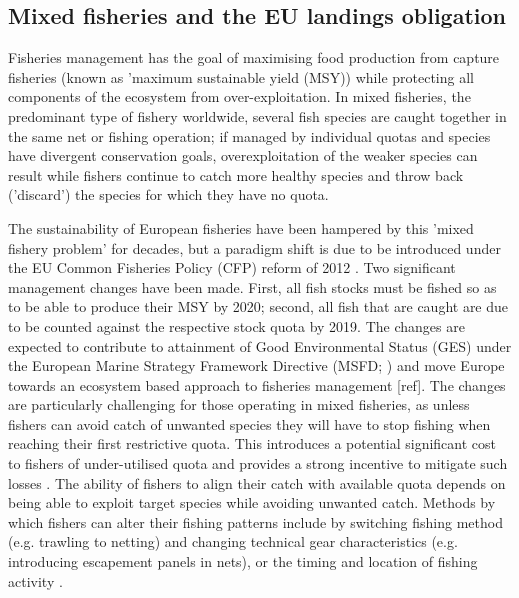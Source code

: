 \documentclass{nature}
\begin{document}
\begin{linenumbers}
\begin{abstract}
[263 words]

\end{abstract}

\section*{}

\subsection{Mixed fisheries and the EU landings obligation} 

Fisheries management has the goal of maximising food production from capture
fisheries (known as 'maximum sustainable yield (MSY)) while protecting all
components of the ecosystem from over-exploitation. In mixed fisheries, the
predominant type of fishery worldwide, several fish species are caught together
in the same net or fishing operation; if managed by individual quotas and
species have divergent conservation goals, overexploitation of the
weaker species can result while fishers continue to catch more healthy species
and throw back ('discard') the species for which they have no quota.

The sustainability of European fisheries have been hampered by this 'mixed
fishery problem' for decades, but a paradigm shift is due to be introduced
under the EU Common Fisheries Policy (CFP) reform of 2012
\cite{EuropeanParliamentandCounciloftheEuropeanUnion2013}. Two significant
management changes have been made. First, all fish stocks must be fished so as
to be able to produce their MSY by 2020; second, all fish that are caught are
due to be counted against the respective stock quota by 2019. The changes are
expected to contribute to attainment of Good Environmental Status (GES) under
the European Marine Strategy Framework Directive (MSFD;
\cite{EuropeanParliament2008}) and move Europe towards an ecosystem based
approach to fisheries management [ref]. The changes are particularly
challenging for those operating in mixed fisheries, as unless fishers can avoid
catch of unwanted species they will have to stop fishing when reaching their
first restrictive quota. This introduces a potential significant cost to
fishers of under-utilised quota\cite{Hoff2010a, Ulrich2016} and provides a
strong incentive to mitigate such losses \cite{Condie2013, Condie2013a}. The
ability of fishers to align their catch with available quota depends on being
able to exploit target species while avoiding unwanted catch. Methods by which
fishers can alter their fishing patterns include by switching fishing method
(e.g. trawling to netting) and changing technical gear characteristics (e.g.
introducing escapement panels in nets), or the timing and location of fishing
activity \cite{Fulton2011b, vanPutten2012a}.


\end{linenumbers}
\end{document}
